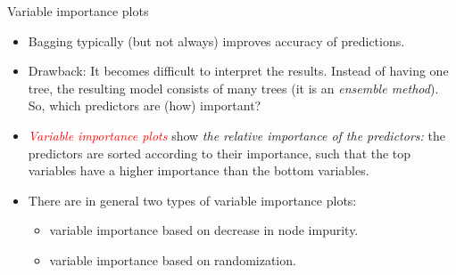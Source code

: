 \documentclass[10pt,ignorenonframetext,]{beamer}
\providecommand{\tightlist}{%
  \setlength{\itemsep}{0pt}\setlength{\parskip}{0pt}}
\begin{document}
\begin{frame}

\begin{block}{Variable importance plots}

\vspace{1mm}

\begin{itemize}
\tightlist
\item
  Bagging typically (but not always) improves accuracy of predictions.
\end{itemize}

\vspace{1mm}

\begin{itemize}
\tightlist
\item
  Drawback: It becomes difficult to interpret the results. Instead of
  having one tree, the resulting model consists of many trees (it is an
  \emph{ensemble method}). So, which predictors are (how) important?
\end{itemize}

\vspace{1mm}

\begin{itemize}
\tightlist
\item
  \emph{\textcolor{red}{Variable importance plots}} show \emph{the
  relative importance of the predictors:} the predictors are sorted
  according to their importance, such that the top variables have a
  higher importance than the bottom variables.
\end{itemize}

\vspace{1mm}

\begin{itemize}
\item
  There are in general two types of variable importance plots:

  \begin{itemize}
  \tightlist
  \item
    variable importance based on decrease in node impurity.
  \item
    variable importance based on randomization.
  \end{itemize}
\end{itemize}

\end{block}

\end{frame}
\end{document}
